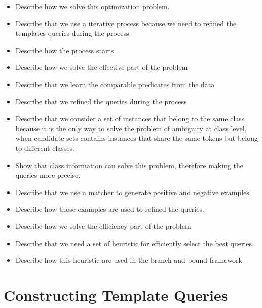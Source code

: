 \begin{itemize}
\item Describe how we solve this optimization problem. 
\item Describe that we use a iterative process because we need to refined the templates queries during the process
\item Describe how the process starts
\item Describe how we solve the effective part of the problem
\item Describe that we learn the comparable predicates from the data
\item Describe that we refined the queries during the process
\item Describe that we consider a set of instances that belong to the same class because it is the only way to solve the problem of ambiguity at class level, when candidate sets contains instances that share the same tokens but belong to different classes.
\item Show that class information can solve this problem, therefore making the queries more precise.
\item Describe that we use a matcher to generate positive and negative examples
\item Describe how those examples are used to refined the queries. 
\item Describe how we solve the efficiency part of the problem
\item Describe that we need a set of heuristic for efficiently select the best queries.
\item Describe how this heuristic are used in the branch-and-bound framework
\end{itemize}


\section{Constructing Template Queries}

